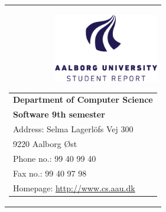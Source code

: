 \Blankpage
{}
\thispagestyle{empty}
\label{chap:titelpage}


    \begin{tabular}{r}
        \parbox{\textwidth}{\raisebox{-15mm}{}
         \includegraphics[height=3cm]{figures/aauLogoEnStudent.png}
         \hfill \parbox{4.9cm}{ %
            \begin{tabular}{l} 
                {\textsf{\small{\textbf{Department of Computer Science}}}}\\
                {\textsf{\small{\textbf{Software 9th semester}}}}\\
                {\textsf{\small{Address: Selma Lagerlöfs Vej 300}}} \\
                {\textsf{\small{\hspace{13 mm} 9220 Aalborg Øst }}} \\
                {\textsf{\small{Phone no.: 99 40 99 40}}} \\
                {\textsf{\small{Fax no.: 99 40 97 98}}} \\
                {\textsf{\small{Homepage: \url{http://www.cs.aau.dk}}}}
            \end{tabular}}}
    \end{tabular}
    

